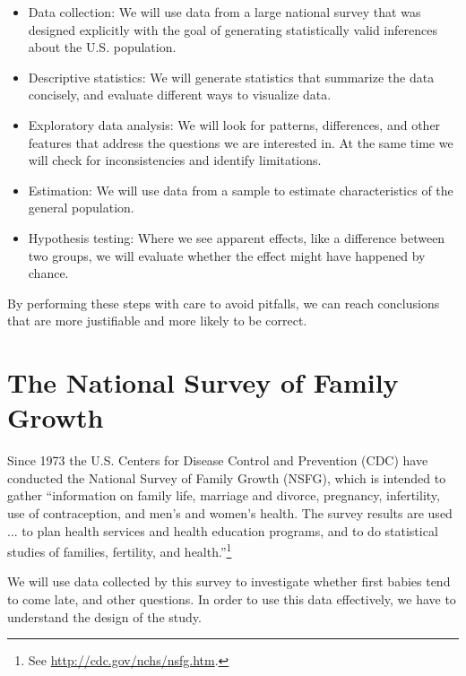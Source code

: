 \documentclass[12pt]{book}
\begin{document}
\begin{itemize}

\item Data collection: We will use data from a large national survey
  that was designed explicitly with the goal of generating
  statistically valid inferences about the U.S. population.

\item Descriptive statistics: We will generate statistics that
  summarize the data concisely, and evaluate different ways to
  visualize data.

\item Exploratory data analysis: We will look for
  patterns, differences, and other features that address the questions
  we are interested in.  At the same time we will check for
  inconsistencies and identify limitations.

\item Estimation: We will use data from a sample to estimate
  characteristics of the general population.

\item Hypothesis testing: Where we see apparent effects, like a
  difference between two groups, we will evaluate whether the effect
  might have happened by chance.

\end{itemize}

By performing these steps with care to avoid pitfalls, we can
reach conclusions that are more justifiable and more likely to be
correct.


\section{The National Survey of Family Growth}
\label{nsfg}

Since 1973 the U.S. Centers for Disease Control and Prevention (CDC)
have conducted the National Survey of Family Growth (NSFG),
which is intended to gather ``information on family life, marriage and
divorce, pregnancy, infertility, use of contraception, and men's and
women's health. The survey results are used ... to plan health services and
health education programs, and to do statistical studies of families,
fertility, and health.''\footnote{See
  \url{http://cdc.gov/nchs/nsfg.htm}.}

We will use data collected by this survey to investigate whether first
babies tend to come late, and other questions.  In order to use this
data effectively, we have to understand the design of the study.
\end{document}
